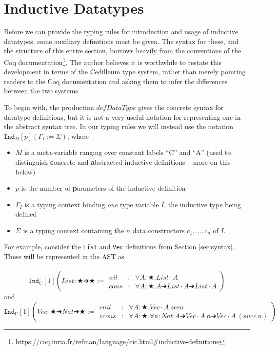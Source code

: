 \documentclass{article}
\newcommand{\indast}[4]{\texttt{Ind}_{#1} [#2] (#3 := #4)}
\begin{document}
\section{Inductive Datatypes}
\label{sec:ind-data}

Before we can provide the typing rules for introduction and usage of inductive
datatypes, some auxiliary definitions must be given. The syntax for these, and
the structure of this entire section, borrows heavily from the conventions of the Coq
documentation\footnote{https://coq.inria.fr/refman/language/cic.html\#inductive-definitions}.
The author believes it is worthwhile to restate this development in terms of the
Cedilleum type system, rather than merely pointing readers to the Coq
documentation and asking them to infer the differences between the two systems.

To begin with, the production $defDataType$ gives the concrete syntax for datatype definitions,
but it is not a very useful notation for representing one in the abstract syntax
tree. In our typing rules we will instead use the notation
$\indast{M}{p}{\Gamma_I}{\Sigma}$, where

\begin{itemize}
\item $M$ is a meta-variable ranging over
  constant labels ``C'' and ``A'' (used to distinguish \textbf{c}oncrete and
  \textbf{a}bstracted inductive definitions -- more on this below)
\item $p$ is the number of \textbf{p}arameters of the inductive definition
\item $\Gamma_I$ is a typing context binding \textit{one} type variable $I$, the
  inductive type being defined
\item $\Sigma$ is a typing context containing the $n$ data constructors
  $c_1,...,c_n$ of $I$.
\end{itemize}

For example, consider the \texttt{List} and \texttt{Vec} definitions from
Section \ref{sec:syntax}. These will be represented in the AST as
\\ \\
\[\indast{\text{C}}{1}{List : ★ ➔ ★}
{\begin{array}{lcl}
   nil & : & ∀ A : ★ . List \cdot A
   \\ cons & : & ∀ A : ★ . A ➔ List \cdot A ➔ List \cdot A
 \end{array}
}\] and
\\
\[\indast{\text{C}}{1}{Vec : ★ ➔ Nat ➔ ★}
{\begin{array}{lcl}
   vnil & : & ∀ A: ★.Vec \cdot\!A\ zero
   \\ vcons & : & ∀ A: ★. ∀ n :Nat. A ➔ Vec \cdot\!A\ n ➔ Vec \cdot\!A\ (succ\ n)
 \end{array}
}\]
\end{document}
